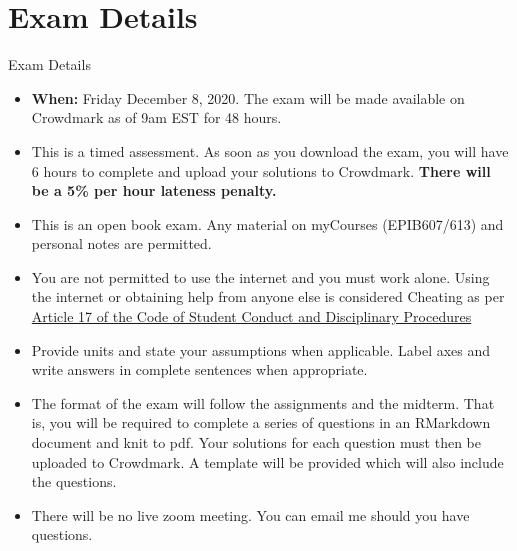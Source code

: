\documentclass[10pt]{beamer}\usepackage[]{graphicx}\usepackage[]{color}
\begin{document}
\section{Exam Details}
\begin{frame}{Exam Details}
	\small
		\begin{itemize}
		\item \textbf{When:} Friday December 8, 2020. The exam will be made available on Crowdmark as of 9am EST for 48 hours. 
		\item This is a timed assessment. As soon as you download the exam, you will have 6 hours to complete and upload your solutions to Crowdmark. \textbf{There will be a 5\% per hour lateness penalty. }
		\item This is an open book exam. Any material on myCourses (EPIB607/613) and personal notes are permitted.
		\item You are not permitted to use the internet and you must work alone. Using the internet or obtaining help from anyone else is considered Cheating as per \href{https://www.mcgill.ca/students/srr/academicrights/integrity/cheating}{Article 17 of the Code of Student Conduct and Disciplinary Procedures}
		\item Provide units and state your assumptions when applicable. Label axes and write answers in complete sentences when appropriate.
		\item The format of the exam will follow the assignments and the midterm. That is, you will be required to complete a series of questions in an RMarkdown document and knit to pdf. Your solutions for each question must then be uploaded to Crowdmark. A template will be provided which will also include the questions. 
		\item There will be no live zoom meeting. You can email me should you have questions. 
	\end{itemize}
	
\end{frame}
\end{document}
